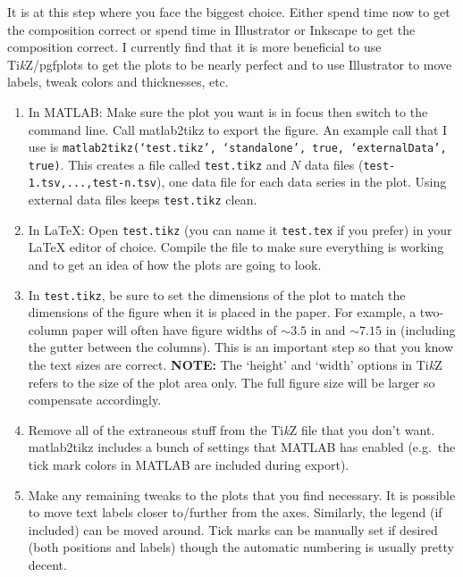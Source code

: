 \documentclass[journal,10pt]{IEEEtran}
\newcommand{\tikz}{\textup{Ti\textit{k}Z}\xspace}
\begin{document}
It is at this step where you face the biggest choice.
Either spend time now to get the composition correct or spend time in Illustrator or Inkscape to get the composition correct.
I currently find that it is more beneficial to use \tikz/pgfplots to get the plots to be nearly perfect and to use Illustrator to move labels, tweak colors and thicknesses, etc.

\begin{enumerate}
\item In MATLAB: Make sure the plot you want is in focus then switch to the command line.
Call matlab2tikz to export the figure.
An example call that I use is \texttt{matlab2tikz(`test.tikz', `standalone', true, `externalData', true)}.
This creates a file called \texttt{test.tikz} and $N$ data files (\texttt{test-1.tsv,...,test-n.tsv}), one data file for each data series in the plot.
Using external data files keeps \texttt{test.tikz} clean.

\item In \LaTeX{}: Open \texttt{test.tikz} (you can name it \texttt{test.tex} if you prefer) in your \LaTeX{} editor of choice.
Compile the file to make sure everything is working and to get an idea of how the plots are going to look.

\item In \texttt{test.tikz}, be sure to set the dimensions of the plot to match the dimensions of the figure when it is placed in the paper.
For example, a two-column paper will often have figure widths of $\sim 3.5$ in and $\sim 7.15$ in (including the gutter between the columns).
This is an important step so that you know the text sizes are correct.
\newline
\textbf{NOTE:} The `height' and `width' options in \tikz refers to the size of the plot area only.
The full figure size will be larger so compensate accordingly.

\item Remove all of the extraneous stuff from the \tikz file that you don't want.
matlab2tikz includes a bunch of settings that MATLAB has enabled (e.g.~the tick mark colors in MATLAB are included during export).

\item Make any remaining tweaks to the plots that you find necessary.
It is possible to move text labels closer to/further from the axes.
Similarly, the legend (if included) can be moved around.
Tick marks can be manually set if desired (both positions and labels) though the automatic numbering is usually pretty decent.
\end{enumerate}
\end{document}
